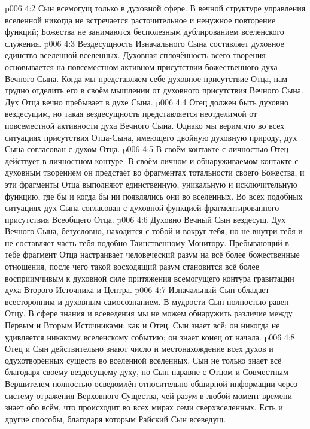 \vs p006 4:2 \pc Сын всемогущ только в духовной сфере. В вечной структуре управления вселенной никогда не встречается расточительное и ненужное повторение функций; Божества не занимаются бесполезным дублированием вселенского служения.
\vs p006 4:3 \pc Вездесущность Изначального Сына составляет духовное единство вселенной вселенных. Духовная сплочённость всего творения основывается на повсеместном активном присутствии божественного духа Вечного Сына. Когда мы представляем себе духовное присутствие Отца, нам трудно отделить его в своём мышлении от духовного присутствия Вечного Сына. Дух Отца вечно пребывает в духе Сына.
\vs p006 4:4 Отец должен быть духовно вездесущим, но такая вездесущность представляется неотделимой от повсеместной активности духа Вечного Сына. Однако мы верим,что во всех ситуациях присутствия Отца\hyp{}Сына, имеющего двойную духовную природу, дух Сына согласован с духом Отца.
\vs p006 4:5 В своём контакте с личностью Отец действует в личностном контуре. В своём личном и обнаруживаемом контакте с духовным творением он предстаёт во фрагментах тотальности своего Божества, и эти фрагменты Отца выполняют единственную, уникальную и исключительную функцию, где бы и когда бы ни появлялись они во вселенных. Во всех подобных ситуациях дух Сына согласован с духовной функцией фрагментированного присутствия Всеобщего Отца.
\vs p006 4:6 Духовно Вечный Сын вездесущ. Дух Вечного Сына, безусловно, находится с тобой и вокруг тебя, но не внутри тебя и не составляет часть тебя подобно Таинственному Монитору. Пребывающий в тебе фрагмент Отца настраивает человеческий разум на всё более божественные отношения, после чего такой восходящий разум становится всё более восприимчивым к духовной силе притяжения всемогущего контура гравитации духа Второго Источника и Центра.
\vs p006 4:7 \pc Изначальный Сын обладает всесторонним и духовным самосознанием. В мудрости Сын полностью равен Отцу. В сфере знания и всеведения мы не можем обнаружить различие между Первым и Вторым Источниками; как и Отец, Сын знает всё; он никогда не удивляется никакому вселенскому событию; он знает конец от начала.
\vs p006 4:8 \pc Отец и Сын действительно знают число и местонахождение всех духов и одухотворённых существ во вселенной вселенных. Сын не только знает всё благодаря своему вездесущему духу, но Сын наравне с Отцом и Совместным Вершителем полностью осведомлён относительно обширной информации через систему отражения Верховного Существа, чей разум в любой момент времени знает обо всём, что происходит во всех мирах семи сверхвселенных. Есть и другие способы, благодаря которым Райский Сын всеведущ.
